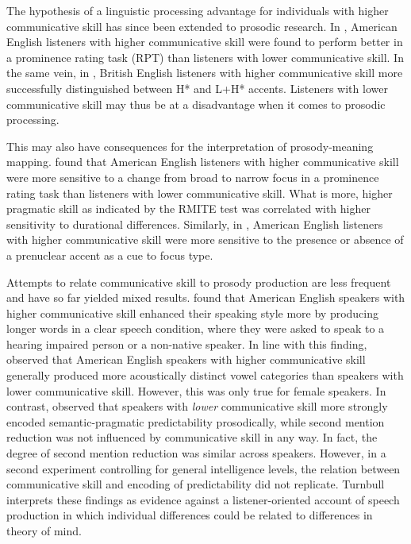 The hypothesis of a linguistic processing advantage for individuals with higher communicative skill has since been extended to prosodic research. In \citet{bishopPhonologyPhoneticsSignalextrinsic2020}, American English listeners with higher communicative skill were found to perform better in a prominence rating task (RPT) than listeners with lower communicative skill. In the same vein, in \citet{orricoInfluenceEmpathyAutisticlike2023}, British English listeners with higher communicative skill more successfully distinguished between H* and L+H* accents. Listeners with lower communicative skill may thus be at a disadvantage when it comes to prosodic processing.

This may also have consequences for the interpretation of prosody-meaning mapping. \citet{bishopIndividualDifferencesTopdown2016} found that American English listeners with higher communicative skill were more sensitive to a change from broad to narrow focus in a prominence rating task than listeners with lower communicative skill. What is more, higher pragmatic skill as indicated by the RMITE test was correlated with higher sensitivity to durational differences. Similarly, in \citet{bishopFocusProjectionPrenuclear2017}, American English listeners with higher communicative skill were more sensitive to the presence or absence of a prenuclear accent as a cue to focus type.

Attempts to relate communicative skill to prosody production are less frequent and have so far yielded mixed results. \citet{turnbullListenerorientedPhoneticReduction2019} found that American English speakers with higher communicative skill enhanced their speaking style more by producing longer words in a clear speech condition, where they were asked to speak to a hearing impaired person or a non-native speaker. In line with this finding, \citet{bishopBriefReportAutistic2022} observed that American English speakers with higher communicative skill generally produced more acoustically distinct vowel categories than speakers with lower communicative skill. However, this was only true for female speakers. In contrast, \citet{turnbullListenerorientedPhoneticReduction2019} observed that speakers with \textit{lower} communicative skill more strongly encoded semantic-pragmatic predictability prosodically, while second mention reduction was not influenced by communicative skill in any way. In fact, the degree of second mention reduction was similar across speakers. However, in a second experiment controlling for general intelligence levels, the relation between communicative skill and encoding of predictability did not replicate. Turnbull interprets these findings as evidence against a listener-oriented account of speech production in which individual differences could be related to differences in theory of mind.

